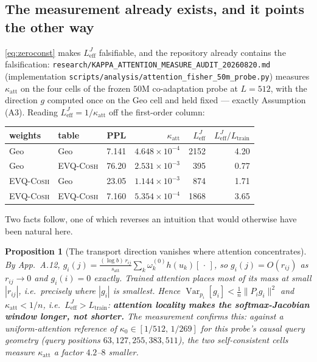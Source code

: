 \documentclass[11pt]{article}
\newtheorem{proposition}[theorem]{Proposition}
\theoremstyle{definition}
\newcommand{\evq}{\textsc{EVQ-Cosh}}
\newcommand{\Ltr}{L_{\mathrm{train}}}
\newcommand{\Leff}{L_{\mathrm{eff}}^{J}}
\DeclareMathOperator{\Var}{Var}
\begin{document}
\subsection{The measurement already exists, and it points the other way}
\label{sec:audit}

\eqref{eq:zeroconst} makes $\Leff$ falsifiable, and the repository already contains the
falsification: \texttt{research/KAPPA\_ATTENTION\_}\allowbreak\texttt{MEASURE\_AUDIT\_20260820.md}
(implementation \texttt{scripts/analysis/attention\_fisher\_50m\_probe.py}) measures
$\kappa_{\mathrm{att}}$ on the four cells of the frozen $50$M co-adaptation probe at $L{=}512$,
with the direction $g$ computed once on the Geo cell and held fixed --- exactly Assumption (A3).
Reading $\Leff=1/\kappa_{\mathrm{att}}$ off the first-order column:

\begin{center}\small
\begin{tabular}{llrrrr}
\toprule
weights & table & PPL & $\kappa_{\mathrm{att}}$ & $\Leff$ & $\Leff/\Ltr$\\
\midrule
Geo & Geo & 7.141 & $4.648{\times}10^{-4}$ & 2152 & 4.20\\
Geo & \evq{} & 76.20 & $2.531{\times}10^{-3}$ & 395 & 0.77\\
\evq{} & Geo & 23.05 & $1.144{\times}10^{-3}$ & 874 & 1.71\\
\evq{} & \evq{} & 7.160 & $5.354{\times}10^{-4}$ & 1868 & 3.65\\
\bottomrule
\end{tabular}
\end{center}

Two facts follow, one of which reverses an intuition that would otherwise have been natural here.

\begin{proposition}[The transport direction vanishes where attention concentrates]\label{prop:sign}
By App.~A.12, $g_i(j)=\frac{(\log b)\,r_{ij}}{s_{\mathrm{att}}}\sum_k\omega_k^{(0)}h(u_k)[\,\cdot\,]$,
so $g_i(j)=O(r_{ij})$ as $r_{ij}\to0$ and $g_i(i)=0$ exactly. Trained attention places most of its
mass at small $|r_{ij}|$, i.e.\ precisely where $|g_i|$ is smallest. Hence
$\Var_{p_i}[g_i]<\frac{1}{n}\|P_ig_i\|^2$ and $\kappa_{\mathrm{att}}<1/n$, i.e.\
$\boxed{\Leff>\Ltr}$: \textbf{attention locality makes the softmax-Jacobian window
\emph{longer}, not shorter.} The measurement confirms this: against a uniform-attention reference
of $\kappa_0\in[1/512,\,1/269]$ for this probe's causal query geometry
(query positions $63,127,255,383,511$), the two self-consistent cells measure
$\kappa_{\mathrm{att}}$ a factor $4.2$--$8$ \emph{smaller}.
\end{proposition}
\end{document}

